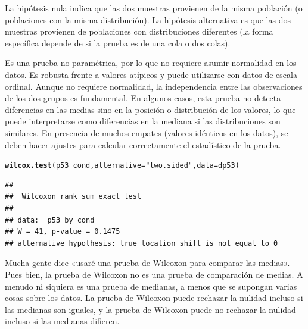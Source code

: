 \documentclass{config/apuntes}\usepackage[]{graphicx}\usepackage[]{xcolor}
\makeatletter
\newcommand{\hlsng}[1]{\textcolor[rgb]{0.192,0.494,0.8}{#1}}%
\newcommand{\hlopt}[1]{\textcolor[rgb]{0,0,0}{#1}}%
\newcommand{\hldef}[1]{\textcolor[rgb]{0.345,0.345,0.345}{#1}}%
\newcommand{\hlkwc}[1]{\textcolor[rgb]{0.333,0.667,0.333}{#1}}%
\newcommand{\hlkwd}[1]{\textcolor[rgb]{0.737,0.353,0.396}{\textbf{#1}}}%
\newenvironment{kframe}{%
 \def\at@end@of@kframe{}%
 \ifinner\ifhmode%
  \def\at@end@of@kframe{\end{minipage}}%
  \begin{minipage}{\columnwidth}%
 \fi\fi%
 \def\FrameCommand##1{\hskip\@totalleftmargin \hskip-\fboxsep
 \colorbox{shadecolor}{##1}\hskip-\fboxsep
     \hskip-\linewidth \hskip-\@totalleftmargin \hskip\columnwidth}%
 \MakeFramed {\advance\hsize-\width
   \@totalleftmargin\z@ \linewidth\hsize
   \@setminipage}}%
 {\par\unskip\endMakeFramed%
 \at@end@of@kframe}
\newenvironment{knitrout}{}{} %
\makeatother
\begin{document}
La hipótesis nula indica que las dos muestras provienen de la misma población (o poblaciones con la misma distribución). La hipótesis alternativa es que las dos muestras provienen de poblaciones con distribuciones diferentes (la forma específica depende de si la prueba es de una cola o dos colas).

Es una prueba no paramétrica, por lo que no requiere asumir normalidad en los datos.
Es robusta frente a valores atípicos y puede utilizarse con datos de escala ordinal.
Aunque no requiere normalidad, la independencia entre las observaciones de los dos grupos es fundamental.
En algunos casos, esta prueba no detecta diferencias en las medias sino en la posición o distribución de los valores, lo que puede interpretarse como diferencias en la mediana si las distribuciones son similares.
En presencia de muchos empates (valores idénticos en los datos), se deben hacer ajustes para calcular correctamente el estadístico de la prueba.

\begin{knitrout}
\color{fgcolor}\begin{kframe}
\begin{alltt}
\hlkwd{wilcox.test}\hldef{(p53} \hlopt{~} \hldef{cond,} \hlkwc{alternative}\hldef{=}\hlsng{"two.sided"}\hldef{,} \hlkwc{data}\hldef{=dp53)}
\end{alltt}
\begin{verbatim}
## 
## 	Wilcoxon rank sum exact test
## 
## data:  p53 by cond
## W = 41, p-value = 0.1475
## alternative hypothesis: true location shift is not equal to 0
\end{verbatim}
\end{kframe}
\end{knitrout}

Mucha gente dice «usaré una prueba de Wilcoxon para comparar las medias». Pues bien, la prueba de Wilcoxon no es una prueba de comparación de medias. A menudo ni siquiera es una prueba de medianas, a menos que se supongan varias cosas sobre los datos. La prueba de Wilcoxon puede rechazar la nulidad incluso si las medianas son iguales, y la prueba de Wilcoxon puede no rechazar la nulidad incluso si las medianas difieren.
\end{document}
